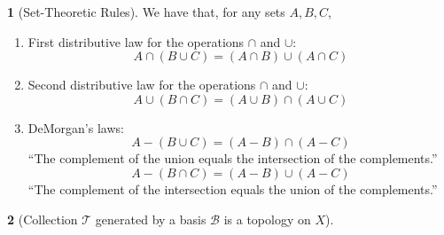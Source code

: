 \documentclass[12pt]{article}
\theoremstyle{definition}
\newtheorem{theorem}{\color{ForestGreen}{\textbf{Theorem}}}
\newcommand{\tT}{\mathcal T}
\newcommand{\bB}{\mathcal B}
\begin{document}
\begin{theorem}[Set-Theoretic Rules]
We have that, for any sets $A, B, C$,
\begin{enumerate}
\item First distributive law for the operations $\cap$ and $\cup$:
\begin{equation}
A \cap (B \cup C) = (A \cap B) \cup (A \cap C)
\end{equation}
\item Second distributive law for the operations $\cap$ and $\cup$:
\begin{equation}
A \cup (B \cap C) = (A \cup B) \cap (A \cup C)
\end{equation}
\item DeMorgan's laws:
\begin{equation}
A - (B \cup C) = (A - B) \cap (A - C)
\end{equation}
``The complement of the union equals the intersection of the complements.''
\begin{equation}
A - (B \cap C) = (A - B) \cup (A - C)
\end{equation}
``The complement of the intersection equals the union of the complements.''
\end{enumerate}
\end{theorem}

\begin{theorem}[Collection $\tT$ generated by a basis $\bB$ is a topology on $X$]
\end{theorem}
\end{document}
